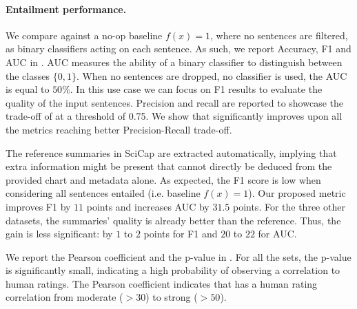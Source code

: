 \paragraph{Entailment performance.}
We compare \metric{} against a no-op baseline $f(x) = 1$, where no sentences are filtered, as binary classifiers acting on each sentence.
As such, we report Accuracy, F1 and AUC in .
AUC measures the ability of a binary classifier to distinguish between the classes $\{0,1\}$. When no sentences are dropped, no classifier is used, the AUC is equal to $50\%$. 
In this use case we can focus on F1 results to evaluate the quality of the input sentences. 
Precision and recall are reported to showcase the trade-off of \metric{} at a threshold of 0.75. 
We show that \metric{} significantly improves upon all the metrics reaching better Precision-Recall trade-off.

The reference summaries in SciCap are extracted automatically, implying that extra information might be present that cannot directly be deduced from the provided chart and metadata alone. As expected, the F1 score is low when considering all sentences entailed (i.e. baseline $f(x) = 1$). Our proposed metric improves F1 by $11$ points and increases AUC by $31.5$ points. For the three other datasets, the summaries' quality is already better than the reference. Thus, the gain is less significant: by $1$ to $2$ points for F1 and $20$ to $22$ for AUC.

We report the Pearson coefficient and the p-value in . For all the sets, the p-value is significantly small, indicating a high probability of observing a correlation to human ratings. The Pearson coefficient indicates that \metric has a human rating correlation from moderate ($>30$) to strong ($>50$). %



